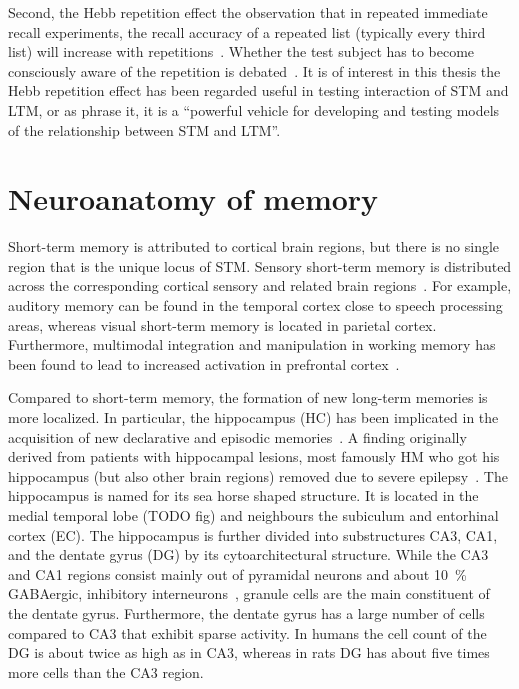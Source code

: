 Second, the Hebb repetition effect the observation that in repeated immediate recall experiments, the recall accuracy of a repeated list (typically every third list) will increase with repetitions~\parencite{Hebb1961}.
Whether the test subject has to become consciously aware of the repetition is debated~\parencite{Stadler1993}.
It is of interest in this thesis the Hebb repetition effect has been regarded useful in testing interaction of STM and LTM, or as \textcite{Burgess2005} phrase it, it is  a ``powerful vehicle for developing and testing models of the relationship between STM and LTM''.


\section{Neuroanatomy of memory}
Short-term memory is attributed to cortical brain regions, but there is no single region that is the unique locus of STM\@.
Sensory short-term memory is distributed across the corresponding cortical sensory and related brain regions~\parencite{zelano2009,todd2004,baldo2012}.
For example, auditory memory can be found in the temporal cortex close to speech processing areas, whereas visual short-term memory is located in parietal cortex.
Furthermore, multimodal integration and manipulation in working memory has been found to lead to increased activation in prefrontal cortex~\parencite{rypma1999}.

Compared to short-term memory, the formation of new long-term memories is more localized.
In particular, the hippocampus (HC) has been implicated in the acquisition of new declarative and episodic memories~\parencite{eichenbaum2001-1}.
A finding originally derived from patients with hippocampal lesions, most famously HM who got his hippocampus (but also other brain regions) removed due to severe epilepsy~\parencite{penfield1958,scoville1957-1,squire2009}.
The hippocampus is named for its sea horse shaped structure.
It is located in the medial temporal lobe (TODO fig) and neighbours the subiculum and entorhinal cortex (EC).
The hippocampus is further divided into substructures CA3, CA1, and the dentate gyrus (DG) by its cytoarchitectural structure.
While the CA3 and CA1 regions consist mainly out of pyramidal neurons and about \SI{10}{\percent} GABAergic, inhibitory interneurons~\parencite{Freund1996}, granule cells are the main constituent of the dentate gyrus.
Furthermore, the dentate gyrus has a large number of cells compared to CA3 that exhibit sparse activity.
In humans the cell count of the DG is about twice as high as in CA3, whereas in rats DG has about five times more cells than the CA3 region.

